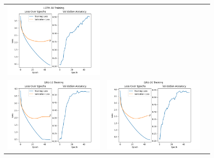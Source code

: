 \documentclass{article}
\begin{document}
\begin{enumerate}[label=1\alph*. ]
\begin{figure}[htb]
\begin{tabularx}{\textwidth}{XXX}
          \includegraphics{images_p1/LSTM_30_training_new.png}   \\
          \includegraphics{images_p1/GRU_10_training_new.png} &
          \includegraphics{images_p1/GRU_20_training_new.png} &

\end{tabularx}
\end{figure}
\end{enumerate}
\end{document}
